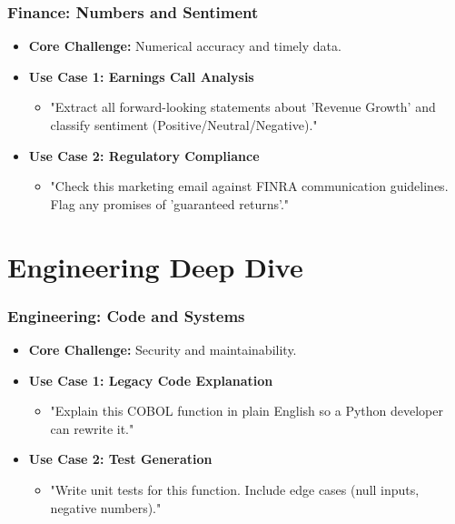 \documentclass{beamer}
\begin{document}
\begin{frame}
    \frametitle{Finance: Numbers and Sentiment}
    \begin{itemize}
        \item \textbf{Core Challenge:} Numerical accuracy and timely data.
        \item \textbf{Use Case 1: Earnings Call Analysis}
        \begin{itemize}
            \item "Extract all forward-looking statements about 'Revenue Growth' and classify sentiment (Positive/Neutral/Negative)."
        \end{itemize}
        \item \textbf{Use Case 2: Regulatory Compliance}
        \begin{itemize}
            \item "Check this marketing email against FINRA communication guidelines. Flag any promises of 'guaranteed returns'."
        \end{itemize}
    \end{itemize}
\end{frame}

\section{Engineering Deep Dive}

\begin{frame}
    \frametitle{Engineering: Code and Systems}
    \begin{itemize}
        \item \textbf{Core Challenge:} Security and maintainability.
        \item \textbf{Use Case 1: Legacy Code Explanation}
        \begin{itemize}
            \item "Explain this COBOL function in plain English so a Python developer can rewrite it."
        \end{itemize}
        \item \textbf{Use Case 2: Test Generation}
        \begin{itemize}
            \item "Write unit tests for this function. Include edge cases (null inputs, negative numbers)."
        \end{itemize}
    \end{itemize}
\end{frame}
\end{document}
